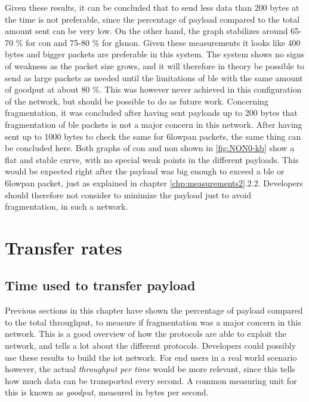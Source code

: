 \noindent Given these results, it can be concluded that to send less data than 200 bytes at the time is not preferable, since the percentage of \gls{payload} compared to the total amount sent can be very low. On the other hand, the graph stabilizes around 65-70 \% for \gls{con} and 75-80 \% for gls{non}. Given these measurements it looks like 400 bytes and bigger packets are preferable in this system. The system shows no signs of weakness as the packet size grows, and it will therefore in theory be possible to send as large packets as needed until the limitations of \gls{ble} with the same amount of goodput at about 80 \%. This was however never achieved in this configuration of the network, but should be possible to do as future work. Concerning fragmentation, it was concluded after having sent \glspl{payload} up to 200 bytes that fragmentation of \gls{ble} packets is not a major concern in this network. After having sent up to 1000 bytes to check the same for \gls{6lowpan} packets, the same thing can be concluded here. Both graphs of \gls{con} and \gls{non} shown in \ref{fig:NON0-kb} show a flat and stable curve, with no special weak points in the different \glspl{payload}. This would be expected right after the \gls{payload} was big enough to exceed a \gls{ble} or \gls{6lowpan} packet, just as explained in chapter \ref{chp:measurements2}.2.2. Developers should therefore not consider to minimize the \gls{payload} just to avoid fragmentation, in such a network. 




\section{Transfer rates}

\subsection{Time used to transfer payload}

\noindent Previous sections in this chapter have shown the percentage of payload compared to the total throughput, to measure if fragmentation was a major concern in this network. This is a good overview of how the protocols are able to exploit the network, and tells a lot about the different protocols. Developers could possibly use these results to build the \gls{iot} network. For end users in a real world scenario however, the actual \textit{throughput per time} would be more relevant, since this tells how much data can be transported every second. A common measuring unit for this is known as \textit{\gls{goodput}}, measured in bytes per second.  



